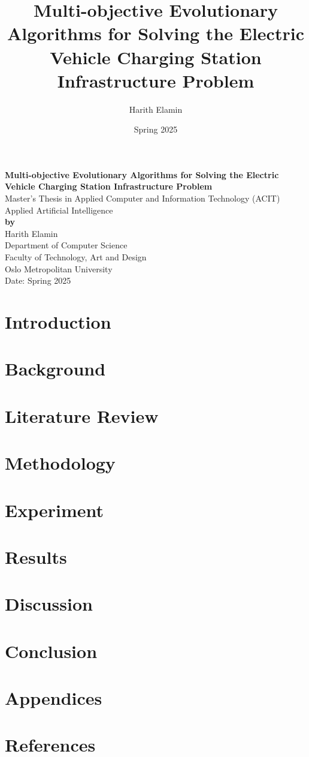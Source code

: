 \documentclass[12pt]{report}
\title{\Huge Multi-objective Evolutionary Algorithms for Solving the Electric Vehicle Charging Station Infrastructure Problem}
\author{\Large Harith Elamin}
\date{\Large Spring 2025}
\begin{document}
\begin{titlepage}
    \centering    
    \textbf{\Huge Multi-objective Evolutionary Algorithms for Solving the Electric Vehicle Charging Station Infrastructure Problem}\\[2em]
    
    \Large Master's Thesis in Applied Computer and Information Technology (ACIT)\\[1em]
    \Large Applied Artificial Intelligence\\[2em]
    
    \textbf{by}\\[1em]
    \Large Harith Elamin\\[2em]
    \large Department of Computer Science\\
    \large Faculty of Technology, Art and Design\\
    \large Oslo Metropolitan University\\[2em]

    \large Date: Spring 2025
    
    \vfill  
\end{titlepage}
\newpage
\tableofcontents
\newpage
\listoffigures

\chapter{Introduction}

\chapter{Background}

\chapter{Literature Review}

\chapter{Methodology}

\chapter{Experiment}

\chapter{Results}

\chapter{Discussion}

\chapter{Conclusion}

\chapter*{Appendices}

\chapter*{References}

\end{document}
